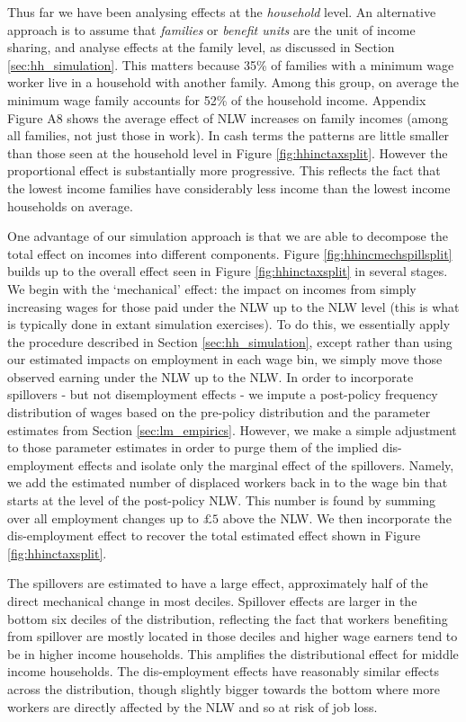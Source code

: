 Thus far we have been analysing effects at the \textit{household} level. An alternative approach is to assume that \textit{families}  or \textit{benefit units} are the unit of income sharing, and analyse effects at the family level, as discussed in Section \ref{sec:hh_simulation}. This matters because 35\% of families with a minimum wage worker live in a household with another family. Among this group, on average the minimum wage family accounts for 52\% of the household income. Appendix Figure A8 shows the average effect of NLW increases on family incomes (among all families, not just those in work). In cash terms the patterns are little smaller than those seen at the household level in Figure \ref{fig:hhinctaxsplit}. However the proportional effect is substantially more progressive. This reflects the fact that the lowest income families have considerably less income than the lowest income households on average.


One advantage of our simulation approach is that we are able to decompose the total effect on incomes into different components. Figure \ref{fig:hhincmechspillsplit} builds up to the overall effect seen in Figure \ref{fig:hhinctaxsplit} in several stages. We begin with the `mechanical' effect: the impact on incomes from simply increasing wages for those paid under the NLW up to the NLW level (this is what is typically done in extant simulation exercises). To do this, we essentially apply the procedure described in Section \ref{sec:hh_simulation}, except rather than using our estimated impacts on employment in each wage bin, we simply move those observed earning under the NLW up to the NLW. In order to incorporate spillovers - but not disemployment effects - we impute a post-policy frequency distribution of wages based on the pre-policy distribution and the parameter estimates from Section \ref{sec:lm_empirics}. However, we make a simple adjustment to those parameter estimates in order to purge them of the implied dis-employment effects and isolate only the marginal effect of the spillovers. Namely, we add the estimated number of displaced workers back in to the wage bin that starts at the level of the post-policy NLW. This number is found by summing over all employment changes up to $\pounds 5$ above the NLW. We then incorporate the dis-employment effect to recover the total estimated effect shown in Figure \ref{fig:hhinctaxsplit}. 

The spillovers are estimated to have a large effect, approximately half of the direct mechanical change in most deciles. Spillover effects are larger in the bottom six deciles of the distribution, reflecting the fact that workers benefiting from spillover are mostly located in those deciles and higher wage earners tend to be in higher income households. This amplifies the distributional effect for middle income households. The dis-employment effects have reasonably similar effects across the distribution, though slightly bigger towards the bottom where more workers are directly affected by the NLW and so at risk of job loss.





